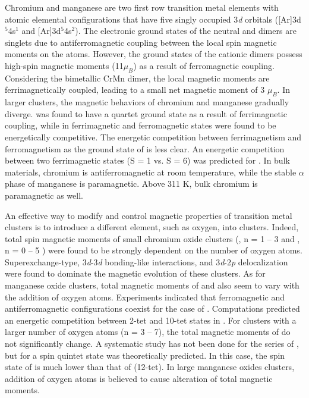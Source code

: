 \begin{refsection}
Chromium and manganese are two first row transition metal elements with atomic elemental configurations that have five singly occupied 3\textit{d} orbitals ([Ar]3d$^5$4s$^1$ and [Ar]3d$^5$4s$^2$). The electronic ground states of the neutral  and  dimers are singlets due to antiferromagnetic coupling between the local spin magnetic moments on the atoms. \cite{Baumann83, Bier88, Vanzee81, Yamamoto06, Bondybey83, Cr2+} However, the ground states of the cationic dimers possess high-spin magnetic moments (11$\mu_B$) as a result of ferromagnetic coupling. \cite{Cr2+, Mn2+, Vanzee88} Considering the bimetallic CrMn dimer, the local magnetic moments are ferrimagnetically coupled, leading to a small net magnetic moment of 3 $\mu_B$. \cite{Mn2+, Desmarais00} In larger clusters, the magnetic behaviors of chromium and manganese gradually diverge.  was found to have a quartet ground state as a result of ferrimagnetic coupling, \cite{Nhan18} while in  ferrimagnetic and ferromagnetic states were found to be energetically competitive. \cite{Gutsev2006, Bobadova2003, Pederson98, Longo2005} The energetic competition between ferrimagnetism and ferromagnetism as the ground state of  is less clear. \cite{Pederson98, Bobadova2003} An energetic competition between two ferrimagnetic states (S = 1 vs. S = 6) was predicted for . \cite{Cr4} In bulk materials, chromium is antiferromagnetic at room temperature,\cite{Fawcett1988} while the stable $\alpha$ phase of manganese is paramagnetic. \cite{Hobbs03} Above 311 K, bulk chromium is paramagnetic as well. \cite{Fawcett1988}  




An effective way to modify and control magnetic properties of transition metal clusters is to introduce a different element, such as oxygen, into clusters. Indeed, total spin magnetic moments of small chromium oxide clusters (, n = 1 -- 3 \cite{Tono2003, Tono2003B, paulCr2On} and , n = 0 -- 5 \cite{Nhan18}) were found to be strongly dependent on the number of oxygen atoms. Superexchange-type, 3\textit{d}-3\textit{d} bonding-like interactions, and 3\textit{d}-2\textit{p} delocalization were found to dominate the magnetic evolution of these clusters. As for manganese oxide clusters, total magnetic moments of  and  also seem to vary with the addition of oxygen atoms. \cite{Khanna04, Marks18} Experiments indicated that ferromagnetic and antiferromagnetic configurations coexist for the case of . \cite{Khanna04} Computations predicted an energetic competition between 2-tet and 10-tet states in . \cite{Marks18} For clusters with a larger number of oxygen atoms (n = 3 -- 7), the total magnetic moments of  do not significantly change. \cite{Gutsev18} A systematic study has not been done for the series of , but for  a spin quintet state was theoretically predicted. \cite{Marks18} In this case, the spin state of  is much lower than that of  (12-tet). \cite{Nhan18} In large manganese oxides clusters, addition of oxygen atoms is believed to cause alteration of total magnetic moments. \cite{Williams12} 




\end{refsection}
